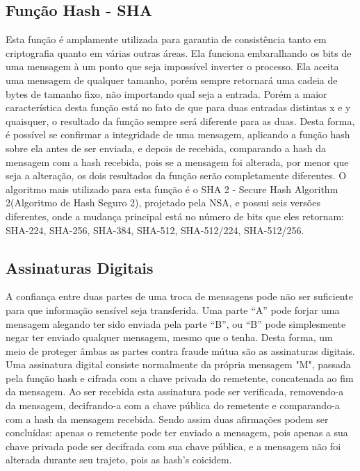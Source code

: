 \documentclass{article}
\begin{document}
		\subsection{Função Hash - SHA}
			\begin{justify}
			

				\hspace{2cm} Esta função é amplamente utilizada para garantia de consistência tanto em criptografia quanto em várias outras áreas. Ela funciona embaralhando os bits de uma mensagem à um ponto que seja impossível inverter o processo. Ela aceita uma mensagem de qualquer tamanho, porém sempre retornará uma cadeia de bytes de tamanho fixo, não importando qual seja a entrada. Porém a maior característica desta função está no fato de que para duas entradas distintas x e y quaisquer, o resultado da função sempre será diferente para as duas. Desta forma, é possível se confirmar a integridade de uma mensagem, aplicando a função hash sobre ela antes de ser enviada, e depois de recebida, comparando a hash da mensagem com a hash recebida, pois se a mensagem foi alterada, por menor que seja a alteração, os dois resultados da função serão completamente diferentes. O algoritmo mais utilizado para esta função é o SHA 2 - Secure Hash Algorithm 2(Algoritmo de Hash Seguro 2), projetado pela NSA, e possui seis versões diferentes, onde a mudança principal está no número de bits que eles retornam: SHA-224, SHA-256, SHA-384, SHA-512, SHA-512/224, SHA-512/256. 
			
			\end{justify}

		\subsection{Assinaturas Digitais}
			\begin{justify}
			

				\hspace{2cm}A confiança entre duas partes de uma troca de mensagens pode não ser suficiente para que informação sensível seja transferida. Uma parte “A” pode forjar uma mensagem alegando ter sido enviada pela parte “B”, ou “B” pode simplesmente negar ter enviado qualquer mensagem, mesmo que o tenha. Desta forma, um meio de proteger âmbas as partes contra fraude mútua são as assinaturas digitais.\\
				\hspace*{2cm}Uma assinatura digital consiste normalmente da própria mensagem "M", passada pela função hash e cifrada com a chave privada do remetente, concatenada ao fim da mensagem. Ao ser recebida esta assinatura pode ser verificada, removendo-a da mensagem, decifrando-a com a chave pública do remetente e comparando-a com a hash da mensagem recebida. Sendo assim duas afirmações podem ser concluídas: apenas o remetente pode ter enviado a mensagem, pois apenas a sua chave privada pode ser decifrada com sua chave pública, e a mensagem não foi alterada durante seu trajeto, pois as hash's coicidem.
			
			
			\end{justify}
\end{document}
